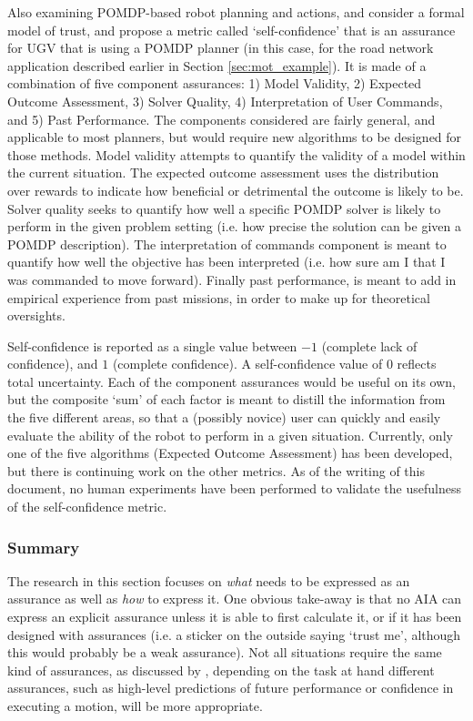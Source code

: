 Also examining POMDP-based robot planning and actions, \citet{Aitken2016-fb} and \citet{Aitken2016-cv} consider a formal model of trust, and propose a metric called `self-confidence' that is an assurance for UGV that is using a  POMDP planner (in this case, for the road network application described earlier in Section \ref{sec:mot_example}). It is made of a combination of five component assurances: 1) Model Validity, 2) Expected Outcome Assessment, 3) Solver Quality, 4) Interpretation of User Commands, and 5) Past Performance. The components considered are fairly general, and applicable to most planners, but would require new algorithms to be designed for those methods. Model validity attempts to quantify the validity of a model within the current situation. The expected outcome assessment uses the distribution over rewards to indicate how beneficial or detrimental the outcome is likely to be. Solver quality seeks to quantify how well a specific POMDP solver is likely to perform in the given problem setting (i.e. how precise the solution can be given a POMDP description). The interpretation of commands component is meant to quantify how well the objective has been interpreted (i.e. how sure am I that I was commanded to move forward). Finally past performance, is meant to add in empirical experience from past missions, in order to make up for theoretical oversights.

Self-confidence is reported as a single value between $-1$ (complete lack of confidence), and $1$ (complete confidence). A self-confidence value of $0$ reflects total uncertainty. Each of the component assurances would be useful on its own, but the composite `sum' of each factor is meant to distill the information from the five different areas, so that a (possibly novice) user can quickly and easily evaluate the ability of the robot to perform in a given situation. Currently, only one of the five algorithms (Expected Outcome Assessment) has been developed, but there is continuing work on the other metrics. As of the writing of this document, no human experiments have been performed to validate the usefulness of the self-confidence metric. 

\subsubsection{Summary}
The research in this section focuses on \emph{what} needs to be expressed as an assurance as well as \emph{how} to express it. One obvious take-away is that no AIA can express an explicit assurance unless it is able to first calculate it, or if it has been designed with assurances (i.e. a sticker on the outside saying `trust me', although this would probably be a weak assurance). Not all situations require the same kind of assurances, as discussed by \cite{Chen2014-dk}, depending on the task at hand different assurances, such as high-level predictions of future performance or confidence in executing a motion, will be more appropriate.

